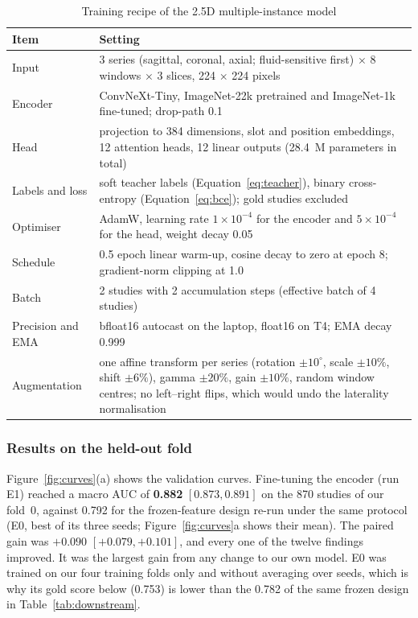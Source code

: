 \begin{table}[htbp]
\centering\footnotesize{}
\caption{Training recipe of the 2.5D multiple-instance model}
\label{tab:milrecipe}
\begin{tabularx}{\textwidth}{L{4.0cm} Y}
\toprule
Item & Setting \\
\midrule
Input & 3 series (sagittal, coronal, axial; fluid-sensitive first) $\times$ 8 windows $\times$ 3 slices, 224 $\times$ 224 pixels \\
Encoder & ConvNeXt-Tiny, ImageNet-22k pretrained and ImageNet-1k fine-tuned; drop-path 0.1 \\
Head & projection to 384 dimensions, slot and position embeddings, 12 attention heads, 12 linear outputs (28.4~M parameters in total) \\
Labels and loss & soft teacher labels (Equation~\ref{eq:teacher}), binary cross-entropy (Equation~\ref{eq:bce}); gold studies excluded \\
Optimiser & AdamW, learning rate $1\times10^{-4}$ for the encoder and $5\times10^{-4}$ for the head, weight decay 0.05 \\
Schedule & 0.5 epoch linear warm-up, cosine decay to zero at epoch 8; gradient-norm clipping at 1.0 \\
Batch & 2 studies with 2 accumulation steps (effective batch of 4 studies) \\
Precision and EMA & bfloat16 autocast on the laptop, float16 on T4; EMA decay 0.999 \\
Augmentation & one affine transform per series (rotation $\pm10^\circ$, scale $\pm10\%$, shift $\pm6\%$), gamma $\pm20\%$, gain $\pm10\%$, random window centres; no left--right flips, which would undo the laterality normalisation \\
\bottomrule
\end{tabularx}
\end{table}

\subsubsection{Results on the held-out fold} Figure~\ref{fig:curves}(a) shows the validation curves. Fine-tuning the encoder (run E1) reached a macro AUC of \textbf{0.882} $[0.873, 0.891]$ on the 870 studies of our fold~0, against 0.792 for the frozen-feature design re-run under the same protocol (E0, best of its three seeds; Figure~\ref{fig:curves}a shows their mean). The paired gain was $+0.090$ $[+0.079, +0.101]$, and every one of the twelve findings improved. It was the largest gain from any change to our own model. E0 was trained on our four training folds only and without averaging over seeds, which is why its gold score below (0.753) is lower than the 0.782 of the same frozen design in Table~\ref{tab:downstream}.


